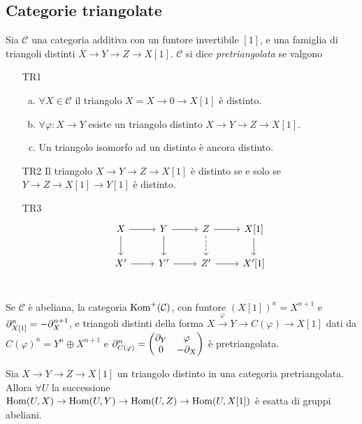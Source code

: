 \subsection{Categorie triangolate}

\begin{definition}
    Sia $\mathcal C$ una categoria additiva con un funtore invertibile $[1]$, e una famiglia di triangoli distinti $X\to Y\to Z\to X[1]$. $\mathcal C$ si dice \emph{pretriangolata} se valgono
    
    \begin{itemize}
        \item[TR1]\begin{enumerate}[a)]
            \item $\forall X\in\mathcal C$ il triangolo $X=X\to0\to X[1]$ è distinto.
            \item $\forall \varphi:X\to Y$ esiste un triangolo distinto $X\to Y\to Z\to X[1]$.
            \item Un triangolo isomorfo ad un distinto è ancora distinto.
        \end{enumerate}
        \item[TR2] Il triangolo $X\to Y\to Z\to X[1]$ è distinto se e solo se $Y\to Z\to X[1]\to Y[1]$ è distinto.
        \item[TR3] $$\begin{tikzcd}
        X \ar[r] \ar[d] & Y \ar[r] \ar[d] & Z \ar[r] \ar[d, dashed] & X[1] \ar[d]\\
        X' \ar[r] & Y' \ar[r] & Z' \ar[r] & X'[1]\\
        \end{tikzcd}$$ 
    \end{itemize}
\end{definition}

\begin{theorem}
    Se $\mathcal C$ è abeliana, la categoria $\operatorname{Kom}^+(\mathcal C)$, con funtore $(X[1])^n=X^{n+1}$ e $\partial_{X[1]}^n=-\partial_X^{n+1}$, e triangoli distinti della forma $X\xrightarrow{\varphi} Y\to C(\varphi)\to X[1]$ dati da $C(\varphi)^n=Y^{n}\oplus X^{n+1}$ e $\partial_{C(\varphi)}^n=\begin{pmatrix}
    \partial_Y & \varphi \\ 0 & -\partial_X
    \end{pmatrix}$ è pretriangolata.
\end{theorem}

\begin{proposition}
    Sia $X\to Y\to Z\to X[1]$ un triangolo distinto in una categoria pretriangolata. Allora $\forall U$ la successione $\operatorname{Hom}(U,X)\to \operatorname{Hom}(U,Y)\to \operatorname{Hom}(U,Z)\to \operatorname{Hom}(U,X[1])$ è esatta di gruppi abeliani.
\end{proposition}

